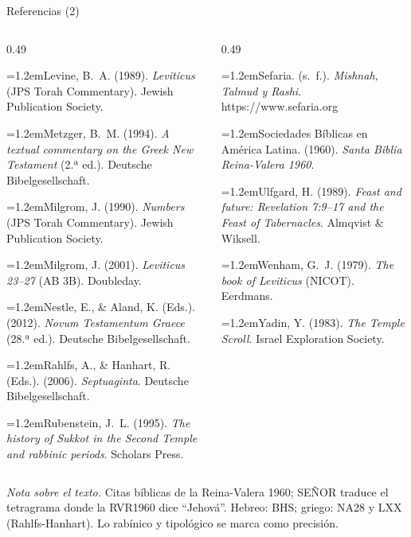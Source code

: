 \documentclass[hyperref={bookmarks=false},aspectratio=169]{beamer}
\newcommand{\SENOR}{S{\fontsize{0.78em}{1em}\selectfont EÑOR}}
\newcommand{\refapa}[1]{\par{\RaggedRight\hangindent=1.2em\hangafter=1\noindent #1\par}\vspace{3pt}}
\begin{document}
\begin{frame}{Referencias (2)}
\fontsize{6}{7.2}\selectfont
\begin{columns}[t,onlytextwidth]
\begin{column}{0.49\textwidth}
\refapa{Levine, B.~A. (1989). \emph{Leviticus} (JPS Torah Commentary). Jewish Publication Society.}
\refapa{Metzger, B.~M. (1994). \emph{A textual commentary on the Greek New Testament} (2.ª ed.). Deutsche Bibelgesellschaft.}
\refapa{Milgrom, J. (1990). \emph{Numbers} (JPS Torah Commentary). Jewish Publication Society.}
\refapa{Milgrom, J. (2001). \emph{Leviticus 23--27} (AB 3B). Doubleday.}
\refapa{Nestle, E., \& Aland, K. (Eds.). (2012). \emph{Novum Testamentum Graece} (28.ª ed.). Deutsche Bibelgesellschaft.}
\refapa{Rahlfs, A., \& Hanhart, R. (Eds.). (2006). \emph{Septuaginta}. Deutsche Bibelgesellschaft.}
\refapa{Rubenstein, J.~L. (1995). \emph{The history of Sukkot in the Second Temple and rabbinic periods}. Scholars Press.}
\end{column}
\begin{column}{0.49\textwidth}
\refapa{Sefaria. (s.~f.). \emph{Mishnah, Talmud y Rashi}. https://www.sefaria.org}
\refapa{Sociedades Bíblicas en América Latina. (1960). \emph{Santa Biblia Reina-Valera 1960}.}
\refapa{Ulfgard, H. (1989). \emph{Feast and future: Revelation 7:9--17 and the Feast of Tabernacles}. Almqvist \& Wiksell.}
\refapa{Wenham, G.~J. (1979). \emph{The book of Leviticus} (NICOT). Eerdmans.}
\refapa{Yadin, Y. (1983). \emph{The Temple Scroll}. Israel Exploration Society.}
\end{column}
\end{columns}\par\medskip
{\fontsize{6}{7.2}\selectfont\color{sepia}\textit{Nota sobre el texto.} Citas bíblicas de la Reina-Valera 1960; \SENOR{} traduce el tetragrama donde la RVR1960 dice ``Jehová''. Hebreo: BHS; griego: NA28 y LXX (Rahlfs-Hanhart). Lo rabínico y tipológico se marca como precisión.}
\end{frame}
\end{document}
